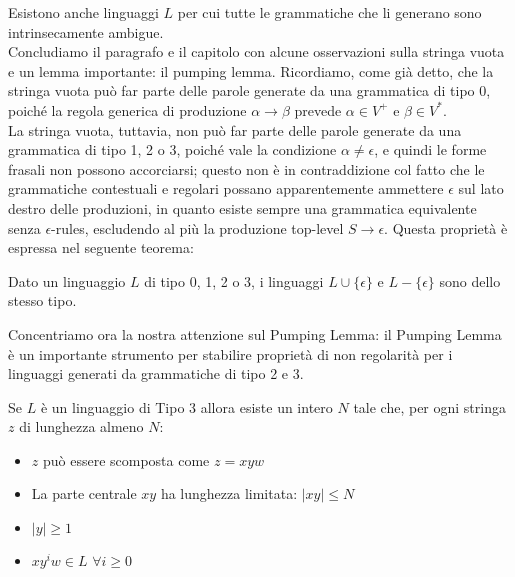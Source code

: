 \documentclass{article}
\begin{document}
Esistono anche linguaggi \( L \) per cui tutte le grammatiche che li generano sono intrinsecamente ambigue.
\\\noindent
Concludiamo il paragrafo e il capitolo con alcune osservazioni sulla stringa vuota e un lemma importante: il pumping lemma. Ricordiamo, come già detto, che la stringa vuota può far parte delle parole generate da una grammatica di tipo 0, poiché la regola generica di produzione \( \alpha \rightarrow \beta \) prevede \( \alpha \in V^+ \) e \( \beta \in V^* \).
\\\noindent La stringa vuota, tuttavia, non può far parte delle parole generate da una grammatica di tipo 1, 2 o 3, poiché vale la condizione \( \alpha \neq \epsilon \), e quindi le forme frasali non possono accorciarsi; questo non è in contraddizione col fatto che le grammatiche contestuali e regolari possano apparentemente ammettere \( \epsilon \) sul lato destro delle produzioni, in quanto esiste sempre una grammatica equivalente senza \( \epsilon \)-rules, escludendo al più la produzione top-level \( S \rightarrow \epsilon \). Questa proprietà è espressa nel seguente teorema:
\\\noindent
\begin{teo}
Dato un linguaggio \( L \) di tipo 0, 1, 2 o 3, i linguaggi \( L \cup \{ \epsilon \} \) e \( L - \{ \epsilon \} \) sono dello stesso tipo.
\end{teo}
Concentriamo  ora la nostra attenzione sul Pumping Lemma:
il Pumping Lemma è un importante strumento per stabilire proprietà di non regolarità per i linguaggi generati da grammatiche di tipo 2 e 3.
\\\noindent

\begin{lemma}
Se \( L \) è un linguaggio di Tipo 3 allora esiste un intero \( N \) tale che, per ogni stringa \( z \) di lunghezza almeno \( N \):

\begin{itemize}
    \item \( z \) può essere scomposta come \( z = xyw \)
    \item La parte centrale \( xy \) ha lunghezza limitata: \( |xy| \leq N \)
    \item \( |y| \geq 1 \)
    \item \( xy^i w \in L \) \(\forall i \geq 0\)
\end{itemize}
\end{lemma}
\end{document}
